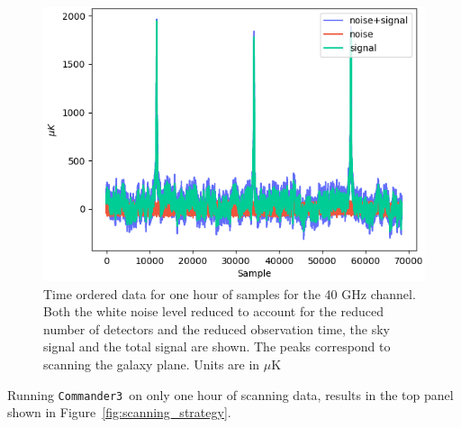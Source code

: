 \documentclass[twocolumn]{aa}
\def\commanderthree{\texttt{Commander3}}
\begin{document}
\begin{figure}[t]
    \includegraphics[width=1\linewidth]{figs/Samples_040_00274.png} 
  \caption{Time ordered data for one hour of samples for the 40 GHz channel. Both the white noise level reduced to account for the reduced number of detectors and the reduced observation time, the sky signal and the total signal are shown. The peaks correspond to scanning the galaxy plane. Units are in $\mu$K}
  \label{fig:sample_timeline}  
\end{figure} %

Running \commanderthree\ on only one hour of scanning data, results in the top panel shown in Figure~\ref{fig:scanning_strategy}. 
\end{document}
